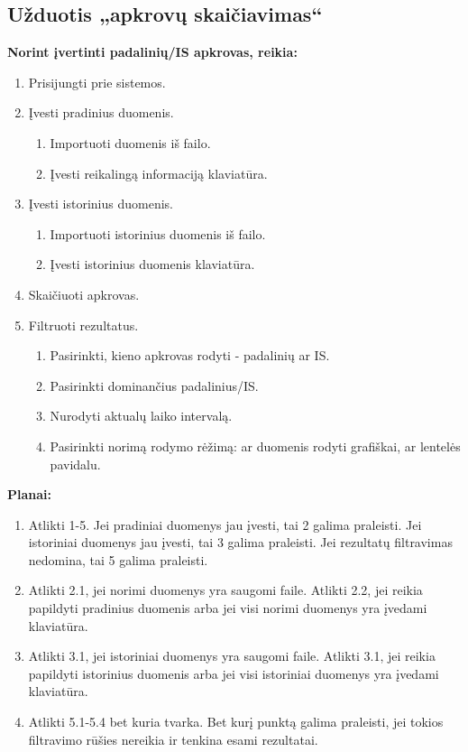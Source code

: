 \subsection{Užduotis „apkrovų skaičiavimas“}

\textbf{Norint įvertinti padalinių/IS apkrovas, reikia:}
\begin{enumerate}
  \item Prisijungti prie sistemos.
  
  \item Įvesti pradinius duomenis.
  \begin{enumerate}
    \item Importuoti duomenis iš failo.
    \item Įvesti reikalingą informaciją klaviatūra.
  \end{enumerate}
  
  \item Įvesti istorinius duomenis.
  \begin{enumerate}
    \item Importuoti istorinius duomenis iš failo.
    \item Įvesti istorinius duomenis klaviatūra.
  \end{enumerate}
  
  \item Skaičiuoti apkrovas.
  \item Filtruoti rezultatus.
  \begin{enumerate}
    \item Pasirinkti, kieno apkrovas rodyti - padalinių ar IS.
    \item Pasirinkti dominančius padalinius/IS.
    \item Nurodyti aktualų laiko intervalą.
    \item Pasirinkti norimą rodymo rėžimą: ar duomenis rodyti grafiškai, ar lentelės pavidalu.
  \end{enumerate}
\end{enumerate}

\vspace{1cm}
\textbf{Planai:}
\begin{enumerate}
  \item Atlikti 1-5. Jei pradiniai duomenys jau įvesti, tai 2 galima praleisti.
  Jei istoriniai duomenys jau įvesti, tai 3 galima praleisti.
  Jei rezultatų filtravimas nedomina, tai 5 galima praleisti.
  
  \item Atlikti 2.1, jei norimi duomenys yra saugomi faile. Atlikti 2.2, jei reikia papildyti
  pradinius duomenis arba jei visi norimi duomenys yra įvedami klaviatūra.
  
  \item Atlikti 3.1, jei istoriniai duomenys yra saugomi faile. Atlikti 3.1, jei reikia papildyti
  istorinius duomenis arba jei visi istoriniai duomenys yra įvedami klaviatūra.
  
  \item Atlikti 5.1-5.4 bet kuria tvarka. Bet kurį punktą galima praleisti, jei tokios filtravimo
  rūšies nereikia ir tenkina esami rezultatai.
\end{enumerate}

